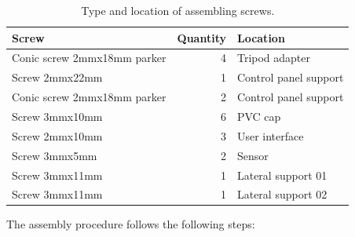 \documentclass[12pt,letterpaper]{article}
\numberwithin{figure}{section}
\numberwithin{equation}{section}
\numberwithin{table}{section}
\begin{document}
\begin{table}[H]
\centering
\caption{Type and location of assembling screws.}
\label{tab:3}
\begin{tabular}{|l|r|l|}
\hline
\textbf{Screw} & \multicolumn{1}{l|}{\textbf{Quantity}} & \textbf{Location}  \\ \hline
Conic screw 2mmx18mm parker & 4 & Tripod adapter   \\ \hline
Screw 2mmx22mm  & 1   & Control panel support \\ \hline
Conic screw 2mmx18mm parker & 2 & Control panel support \\ \hline
Screw 3mmx10mm & 6 & PVC cap \\ \hline
Screw 2mmx10mm & 3 & User interface   \\ \hline
Screw 3mmx5mm & 2  & Sensor   \\ \hline
Screw 3mmx11mm & 1 & Lateral support 01  \\ \hline
Screw 3mmx11mm & 1 & Lateral support 02  \\ \hline
\end{tabular}
\end{table}

The assembly procedure follows the following steps:
\end{document}
